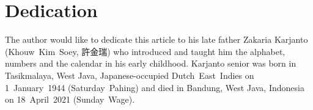 \documentclass[symmetry,article,accept,moreauthors,pdftex,a4paper]{mdpi}
\begin{document}
\section*{Dedication}
\noindent
The author would like to dedicate this article to his late father Zakaria Karjanto (Khouw~Kim~Soey, 許金瑞) who introduced and taught him the alphabet, numbers and the calendar in his early childhood. Karjanto senior was born in Tasikmalaya, West Java, Japanese-occupied Dutch~East~Indies on 1~January~1944 (Saturday~Pahing) and died in Bandung, West Java, Indonesia on 18~April~2021 (Sunday~Wage). 

\end{document}
